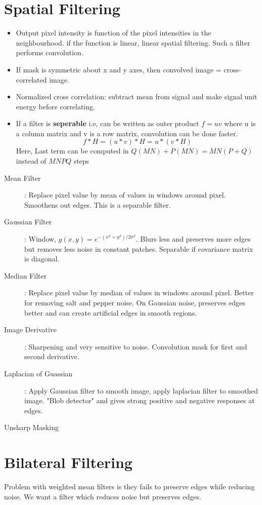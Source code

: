 \documentclass[a4paper,11pt]{article}
\begin{document}
\section{Spatial Filtering}
\begin{itemize}[leftmargin=0pt]
\item[] Output pixel intensity is function of the pixel intensities in the neighbourhood. if the function is linear, linear spatial filtering. Such a filter performs convolution.
\item[] If mask is symmetric about x and y axes, then convolved image = cross-correlated image. 
\item[] Normalized cross correlation: subtract mean from signal and make signal unit energy before correlating.
\item[] If a filter is \textbf{seperable} i.e, can be written as outer product $f = u v$ where u is a column matrix and v is a row matrix, convolution can be done faster. $$f*H = (u*v)*H = u*(v*H)$$
Here, Last term can be computed in $Q(MN)+P(MN) = MN(P+Q)$ instead of $MNPQ$ steps
\end{itemize}


\begin{description}
\item[Mean Filter]: Replace pixel value by mean of values in windows around pixel. Smoothens out edges. This is a separable filter.
\item[Gaussian Filter]: Window, $g(x,y) = e^{-(x^2+y^2)/2\sigma^2}$. Blurs less and preserves more edges but removes less noise in constant patches. Separable if covariance matrix is diagonal.
\item[Median Filter]: Replace pixel value by median of values in windows around pixel. Better for removing salt and pepper noise. On Gaussian noise, preserves edges better and can create artificial edges in smooth regions.
\item[Image Derivative]: Sharpening and very sensitive to noise. Convolution mask for first and second derivative.
\item[Laplacian of Guassian]: Apply Gaussian filter to smooth image, apply laplacian filter to smoothed image. "Blob detector" and gives strong positive and negative responses at edges.
\item[Unsharp Masking]
\end{description}

\section{Bilateral Filtering}
Problem with weighted mean filters is they fails to preserve edges while reducing noise. We want a filter which reduces noise but preserves edges.
\end{document}
